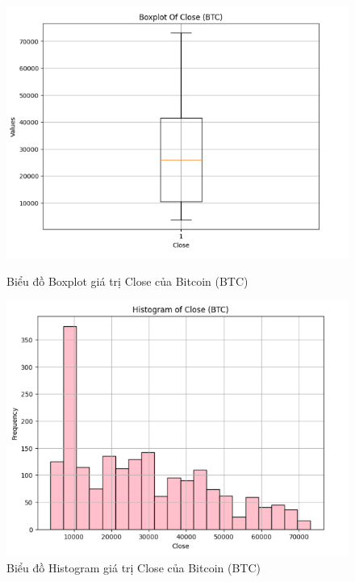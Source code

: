 \documentclass[conference]{IEEEtran}
\begin{document}
\begin{figure}[H]
    \centering
    \begin{minipage}{0.23\textwidth}
    \centering
    \includegraphics[width=1\textwidth]{Figure/BTCBoxplot.png}
    \caption{Biểu đồ Boxplot giá trị Close của Bitcoin (BTC)}
    \label{fig:1}
    \end{minipage}
    \hfill
    \begin{minipage}{0.23\textwidth}
    \centering
    \includegraphics[width=1\textwidth]{Figure/BTCHistogram.png}
    \caption{Biểu đồ Histogram giá trị Close của Bitcoin (BTC)}
    \label{fig:2}
    \end{minipage}
\end{figure}
\end{document}

